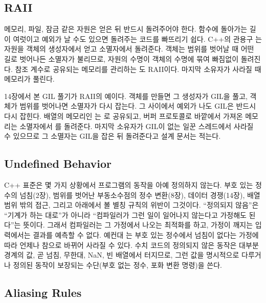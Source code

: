\subsection{RAII}

메모리, 파일, 잠금 같은 자원은 얻은 뒤 반드시 돌려주어야 한다. 함수에 돌아가는 길이 여럿이고 예외가 날 수도 있으면 돌려주는 코드를 빠뜨리기 쉽다. C++의 관용구 는 자원을 객체의 생성자에서 얻고 소멸자에서 돌려준다\cite{stroustrup2013cpp}. 객체는 범위를 벗어날 때 어떤 길로 벗어나든 소멸자가 불리므로, 자원의 수명이 객체의 수명에 묶여 빠짐없이 돌려진다. 참조 계수로 공유되는 메모리를 관리하는 도 RAII이다. 마지막 소유자가 사라질 때 메모리가 풀린다.

\begin{instardust}
14장에서 본 GIL 풀기가 RAII의 예이다.  객체를 만들면 그 생성자가 GIL을 풀고, 객체가 범위를 벗어나면 소멸자가 다시 잡는다. 그 사이에서 예외가 나도 GIL은 반드시 다시 잡힌다. 배열의 메모리인 는 로 공유되고, 버퍼 프로토콜로 바깥에서 가져온 메모리는 소멸자에서 를 돌려준다. 마지막 소유자가 GIL이 없는 일꾼 스레드에서 사라질 수 있으므로 그 소멸자는 GIL을 잡은 뒤 돌려준다고 설계 문서는 적는다.
\end{instardust}

\subsection{Undefined Behavior}

C++ 표준은 몇 가지 상황에서 프로그램의 동작을 아예 정의하지 않는다. 부호 있는 정수의 넘침(2장), 범위를 벗어난 부동소수점의 정수 변환(8장), 데이터 경쟁(14장), 배열 범위 밖의 접근, 그리고 아래에서 볼 별칭 규칙의 위반이 그것이다. ``정의되지 않음''은 ``기계가 하는 대로''가 아니라 ``컴파일러가 그런 일이 일어나지 않는다고 가정해도 된다''는 뜻이다\cite{iso14882-2020}. 그래서 컴파일러는 그 가정에서 나오는 최적화를 하고, 가정이 깨지는 입력에서는 결과를 예측할 수 없다. 예컨대 는 부호 있는 정수에서 넘침이 없다는 가정에 따라 언제나 참으로 바뀌어 사라질 수 있다\cite{lattner2011ub}. 수치 코드의 정의되지 않은 동작은 대부분 경계의 값, 곧 넘침, 무한대, NaN, 빈 배열에서 터지므로, 그런 값을 명시적으로 다루거나 정의된 동작이 보장되는 수단(부호 없는 정수, 포화 변환 명령)을 쓴다.

\subsection{Aliasing Rules}

